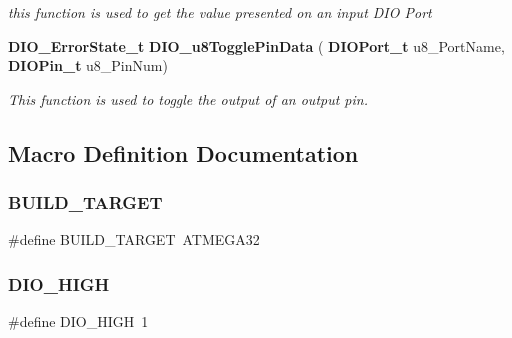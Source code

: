 \begin{DoxyCompactItemize}
\begin{DoxyCompactList}\small\item\em this function is used to get the value presented on an input D\+IO Port \end{DoxyCompactList}\item 
\textbf{ D\+I\+O\+\_\+\+Error\+State\+\_\+t} \textbf{ D\+I\+O\+\_\+u8\+Toggle\+Pin\+Data} (\textbf{ D\+I\+O\+Port\+\_\+t} u8\+\_\+\+Port\+Name, \textbf{ D\+I\+O\+Pin\+\_\+t} u8\+\_\+\+Pin\+Num)
\begin{DoxyCompactList}\small\item\em This function is used to toggle the output of an output pin. \end{DoxyCompactList}\end{DoxyCompactItemize}


\subsection{Macro Definition Documentation}
\mbox{\label{_d_i_o__interface_8h_acc699f35be05baef897f49e042f5a05d}} 
\subsubsection{B\+U\+I\+L\+D\+\_\+\+T\+A\+R\+G\+ET}
{\footnotesize\ttfamily \#define B\+U\+I\+L\+D\+\_\+\+T\+A\+R\+G\+ET~A\+T\+M\+E\+G\+A32}

\mbox{\label{_d_i_o__interface_8h_a8bc63994a481798464caf18cd08b6c45}} 
\subsubsection{D\+I\+O\+\_\+\+H\+I\+GH}
{\footnotesize\ttfamily \#define D\+I\+O\+\_\+\+H\+I\+GH~1}

\mbox{\label{_d_i_o__interface_8h_a199d8c89f64de45151ce89e33e1ae558}} 
